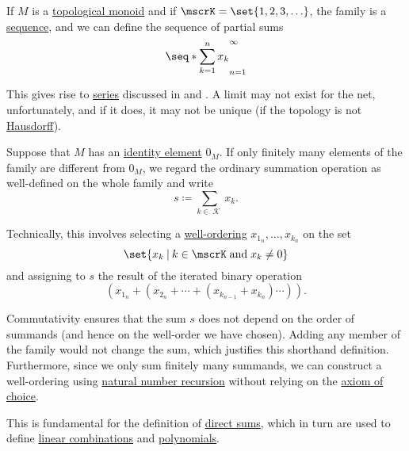 \begin{remark}
\begin{thmenum}
\begin{thmenum}
       If \( M \) is a \hyperref[rem:topological_first_order_structures]{topological monoid} and if \( \mscrK = \set{ 1, 2, 3, \ldots } \), the family is a \hyperref[def:sequence]{sequence}, and we can define the sequence of partial sums
      \begin{equation*}
        \seq*{ \sum_{k=1}^n x_k }_{n=1}^\infty
      \end{equation*}

      This gives rise to \hyperref[def:convergent_series]{series} discussed in  and . A limit may not exist for the net, unfortunately, and if it does, it may not be unique (if the topology is not \hyperref[def:separation_axioms/T2]{Hausdorff}).

       Suppose that \( M \) has an \hyperref[def:monoid]{identity element} \( 0_M \). If only finitely many elements of the family are different from \( 0_M \), we regard the ordinary summation operation as well-defined on the whole family and write
      \begin{equation*}
        s \coloneqq \sum_{k \in \mscrK} x_k.
      \end{equation*}

      Technically, this involves selecting a \hyperref[def:well_ordered_set]{well-ordering} \( x_{1_n}, \ldots, x_{k_n} \) on the set
      \begin{equation*}
        \set{ x_k \given k \in \mscrK \T{and} x_k \neq 0 }
      \end{equation*}
      and assigning to \( s \) the result of the iterated binary operation
      \begin{equation*}
        (x_{1_n} + (x_{2_n} + \cdots + (x_{k_{n-1}} + x_{k_n}) \cdots)).
      \end{equation*}

      Commutativity ensures that the sum \( s \) does not depend on the order of summands (and hence on the well-order we have chosen). Adding any member of the family would not change the sum, which justifies this shorthand definition. Furthermore, since we only sum finitely many summands, we can construct a well-ordering using \hyperref[rem:natural_number_recursion]{natural number recursion} without relying on the \hyperref[def:zfc/choice]{axiom of choice}.

      This is fundamental for the definition of \hyperref[def:monoid_direct_product]{direct sums}, which in turn are used to define \hyperref[rem:linear_combinations]{linear combinations} and \hyperref[def:polynomial_algebra]{polynomials}.
    \end{thmenum}
  \end{thmenum}
\end{remark}
